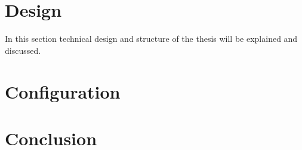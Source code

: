 \clearpage
\section{Design}
\label{des:proj}

In this section technical design and structure of the thesis will be explained and discussed. 

\clearpage
\section{Configuration}
\label{des:conf}

\section{Conclusion}
\label{des:conc}